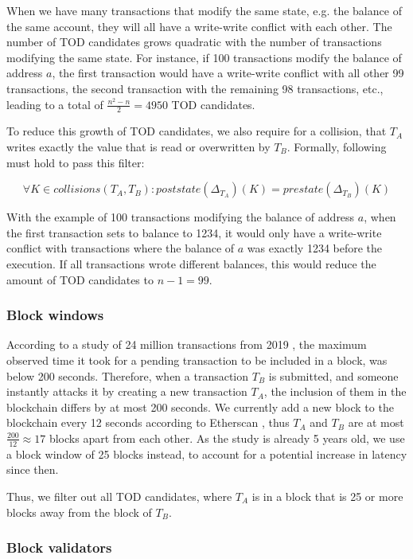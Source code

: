\documentclass[draft,final]{vutinfth} %
\begin{document}
When we have many transactions that modify the same state, e.g. the balance of the same account, they will all have a write-write conflict with each other. The number of TOD candidates grows quadratic with the number of transactions modifying the same state. For instance, if 100 transactions modify the balance of address $a$, the first transaction would have a write-write conflict with all other 99 transactions, the second transaction with the remaining 98 transactions, etc., leading to a total of $\frac{n^2-n}{2} = 4950$ TOD candidates.

To reduce this growth of TOD candidates, we also require for a collision, that $T_A$ writes exactly the value that is read or overwritten by $T_B$. Formally, following must hold to pass this filter:

$$\forall K \in collisions(T_A, T_B)\colon poststate(\Delta_{T_A})(K) = prestate(\Delta_{T_B})(K)$$

With the example of 100 transactions modifying the balance of address $a$, when the first transaction sets to balance to 1234, it would only have a write-write conflict with transactions where the balance of $a$ was exactly 1234 before the execution. If all transactions wrote different balances, this would reduce the amount of TOD candidates to $n-1 = 99$.

\subsubsection{Block windows}

According to a study of 24 million transactions from 2019 \cite{zhang_evaluation_2021}, the maximum observed time it took for a pending transaction to be included in a block, was below 200 seconds. Therefore, when a transaction $T_B$ is submitted, and someone instantly attacks it by creating a new transaction $T_A$, the inclusion of them in the blockchain differs by at most 200 seconds. We currently add a new block to the blockchain every 12 seconds according to Etherscan \cite{etherscan_ethereum_2024}, thus $T_A$ and $T_B$ are at most $\frac{200}{12} \approx 17$ blocks apart from each other. As the study is already 5 years old, we use a block window of 25 blocks instead, to account for a potential increase in latency since then.

Thus, we filter out all TOD candidates, where $T_A$ is in a block that is 25 or more blocks away from the block of $T_B$.

\subsubsection{Block validators}
\end{document}
